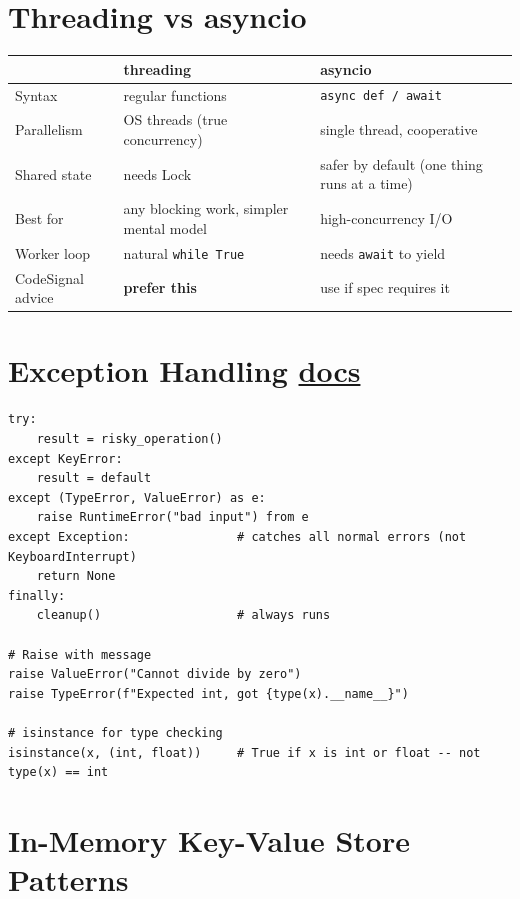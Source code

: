\documentclass[10pt,letterpaper]{article}
\begin{document}
\section{Threading vs asyncio}

\begin{center}
\begin{tabular}{lll}
\toprule
 & \textbf{threading} & \textbf{asyncio} \\
\midrule
Syntax & regular functions & \texttt{async def / await} \\
Parallelism & OS threads (true concurrency) & single thread, cooperative \\
Shared state & needs Lock & safer by default (one thing runs at a time) \\
Best for & any blocking work, simpler mental model & high-concurrency I/O \\
Worker loop & natural \texttt{while True} & needs \texttt{await} to yield \\
CodeSignal advice & \textbf{prefer this} & use if spec requires it \\
\bottomrule
\end{tabular}
\end{center}

\section{Exception Handling \normalfont\small\href{https://docs.python.org/3/library/exceptions.html}{docs}}

\begin{lstlisting}
try:
    result = risky_operation()
except KeyError:
    result = default
except (TypeError, ValueError) as e:
    raise RuntimeError("bad input") from e
except Exception:               # catches all normal errors (not KeyboardInterrupt)
    return None
finally:
    cleanup()                   # always runs

# Raise with message
raise ValueError("Cannot divide by zero")
raise TypeError(f"Expected int, got {type(x).__name__}")

# isinstance for type checking
isinstance(x, (int, float))     # True if x is int or float -- not type(x) == int
\end{lstlisting}

\section{In-Memory Key-Value Store Patterns}
\end{document}
